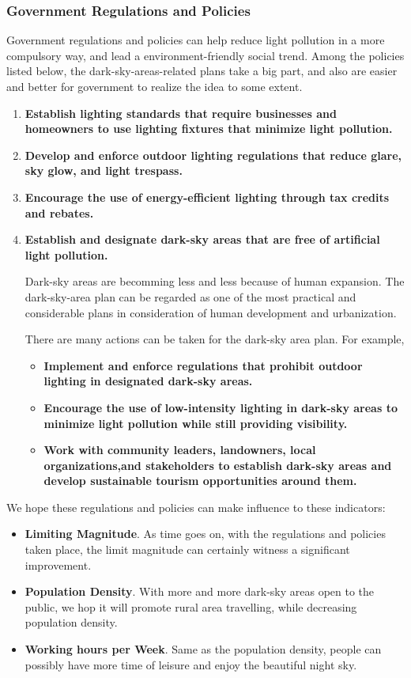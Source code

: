 \subsubsection{Government Regulations and Policies}
Government regulations and policies can help reduce light pollution in a more compulsory way, and lead a environment-friendly social trend. Among the policies listed below, the dark-sky-areas-related plans take a big part, and also are easier and better for government to realize the idea to some extent.
\begin{enumerate}
    \item \textbf{Establish lighting standards that require businesses and homeowners to use lighting fixtures that minimize light pollution.}
    
    \item \textbf{Develop and enforce outdoor lighting regulations that reduce glare, sky glow, and light trespass.}
    
    \item \textbf{Encourage the use of energy-efficient lighting through tax credits and rebates.}

    \item \textbf{Establish and designate dark-sky areas that are free of artificial light pollution.} 
    
    Dark-sky areas are becomming less and less because of human expansion. The dark-sky-area plan can be regarded as one of the most practical and considerable plans in consideration of human development and urbanization. 
    
    There are many actions can be taken for the dark-sky area plan. For example, 
    \begin{itemize}
        \item \textbf{Implement and enforce regulations that prohibit outdoor lighting in designated dark-sky areas.}
        \item \textbf{Encourage the use of low-intensity lighting in dark-sky areas to minimize light pollution while still providing visibility.}
        \item \textbf{Work with community leaders, landowners, local organizations,and stakeholders to establish dark-sky areas and develop sustainable tourism opportunities around them.}
    \end{itemize}
\end{enumerate}

We hope these regulations and policies can make influence to these indicators:
\begin{itemize}
    \item \textbf{Limiting Magnitude}. As time goes on, with the regulations and policies taken place, the limit magnitude can certainly witness a significant improvement.
    \item \textbf{Population Density}. With more and more dark-sky areas open to the public, we hop it will promote rural area travelling, while decreasing population density.
    \item \textbf{Working hours per Week}. Same as the population density, people can possibly have more time of leisure and enjoy the beautiful night sky.
\end{itemize}

